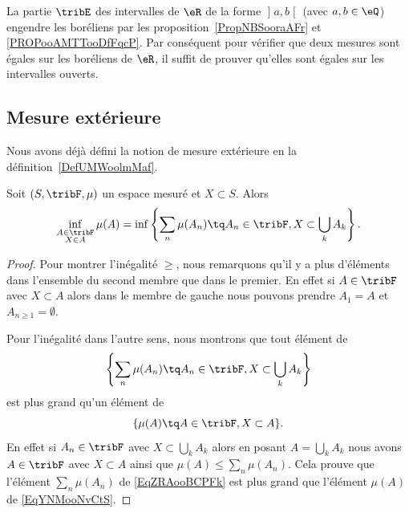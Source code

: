 \begin{example}\label{ExDMPoohtNAj}
	La partie \( \tribE\) des intervalles de \( \eR\) de la forme \( \mathopen] a , b \mathclose[\) (avec \( a,b\in \eQ\)) engendre les boréliens par les proposition~\ref{PropNBSooraAFr} et \ref{PROPooAMTTooDfFqcP}. Par conséquent pour vérifier que deux mesures sont égales sur les boréliens de \( \eR\), il suffit de prouver qu'elles sont égales sur les intervalles ouverts.
\end{example}

\subsection{Mesure extérieure}

Nous avons déjà défini la notion de mesure extérieure en la définition~\ref{DefUMWoolmMaf}.

\begin{lemma}  \label{LemULSooBgZLI}
	Soit \( (S,\tribF,\mu)\) un espace mesuré et \( X\subset S\). Alors
	\begin{equation}
		\inf_{\substack{A\in\tribF\\X\in A}}\mu(A) = \inf\left\{ \sum_n\mu(A_n) \tq A_n\in\tribF,X\subset\bigcup_kA_k \right\}.
	\end{equation}
\end{lemma}

\begin{proof}
	Pour montrer l'inégalité \( \geq\), nous remarquons qu'il y a plus d'éléments dans l'ensemble du second membre que dans le premier. En effet si \( A\in\tribF\) avec \( X\subset A\) alors dans le membre de gauche nous pouvons prendre \( A_1=A\) et \( A_{n\geq 1}=\emptyset\).

	Pour l'inégalité dans l'autre sens, nous montrons que tout élément de
	\begin{equation}    \label{EqZRAooBCPFk}
		\left\{ \sum_n\mu(A_n) \tq A_n\in\tribF,X\subset\bigcup_kA_k \right\}
	\end{equation}
	est plus grand qu'un élément de
	\begin{equation}    \label{EqYNMooNvCtS}
		\{ \mu(A)\tq A\in\tribF,X\subset A \}.
	\end{equation}
	En effet si \( A_n\in\tribF\) avec \( X\subset \bigcup_kA_k\) alors en posant \( A=\bigcup_kA_k\) nous avons \( A\in\tribF\) avec \( X\subset A\) ainsi que \( \mu(A)\leq\sum_n\mu(A_n)\). Cela prouve que l'élément \( \sum_n\mu(A_n)\) de \eqref{EqZRAooBCPFk} est plus grand que l'élément \( \mu(A)\) de \eqref{EqYNMooNvCtS}.
\end{proof}

